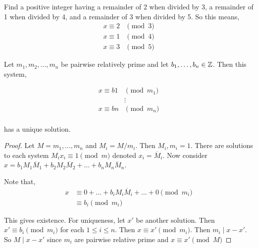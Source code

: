 \begin{eg}
	Find a positive integer having a remainder of 2 when divided by 3, a remainder of 1 when divided by 4, and a remainder of 3 when divided by 5. So this means,
	\begin{align*}
		x \equiv 2 &\pmod 3\\
		x \equiv 1 &\pmod 4\\
		x \equiv 3 &\pmod 5
	\end{align*}
\end{eg}
\begin{theorem}
	Let \( m_1, m_2, \dots, m_n \) be pairwise relatively prime and let \( b_1, \dots, b_n \in \mathbb{Z} \).  Then this system,

	\begin{align*}
		x \equiv b1 &\pmod {m_1}\\
			    &\vdots\\
		x \equiv bn &\pmod {m_n}\\
	\end{align*}

	has a unique solution.
\end{theorem}
\begin{proof}
	Let \( M = m_1, \dots, m_n \) and \( M_i = M/m_i\). Then \( M_i, m_i = 1 \). There are solutions to each system \( M_ix_i \equiv 1 \pmod m \) denoted \( x_i = \overline M_i \). Now consider \( x = b_1M_1\overline M_1 +  b_2M_2\overline M_2 + \dots +  b_nM_n\overline M_n \).

	\vspace{1em}

	Note that,
	\begin{align*}
		x &\equiv 0 + \dots + b_iM_i\overline M_i + \dots + 0 \pmod m_i \\
		  & \equiv b_i \pmod m_i
	\end{align*}

	This gives existence. For uniqueness, let \( x' \) be another solution. Then \( x' \equiv b_i \pmod m_i \) for each \( 1 \le i \le n \). Then \( x \equiv x' \pmod m_i \). Then \( m_i \mid x - x' \). So \( M \mid x - x' \) since \( m_i \) are pairwise relative prime and \( x \equiv x' \pmod M \)
\end{proof}



